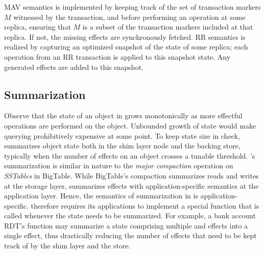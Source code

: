 MAV semantics is implemented by keeping track of the set of
transaction markers $M$ witnessed by the transaction, and before
performing an operation at some replica, ensuring that $M$ is a subset
of the transaction markers included at that replica. If not, the
missing effects are synchronously fetched. RR semantics is realized by
capturing an optimized snapshot of the state of some replica; each
operation from an RR transaction is applied to this snapshot state.
Any generated effects are added to this snapshot.

\subsection{Summarization}

Observe that the state of an object in \name grows monotonically as
more effectful operations are performed on the object. Unbounded
growth of state would make querying prohibitively expensive at some
point.  To keep state size in check, \name summarizes object state
both in the shim layer node and the backing store, typically when the
number of effects on an object crosses a tunable threshold. \name's
summarization is similar in nature to the \emph{major compaction}
operation on \emph{SSTables} in BigTable.  While BigTable's compaction
summarizes reads and writes at the storage layer, \name summarizes
effects with application-specific semantics at the application layer.
Hence, the semantics of summarization in \name is
application-specific.  \name therefore requires its applications to
implement a special  function that is called whenever
the state needs to be summarized. For example, a bank account RDT's
 function may summarize a state comprising multiple
 and  effects into a single 
effect, thus drastically reducing the number of effects that need to
be kept track of by the shim layer and the store.

